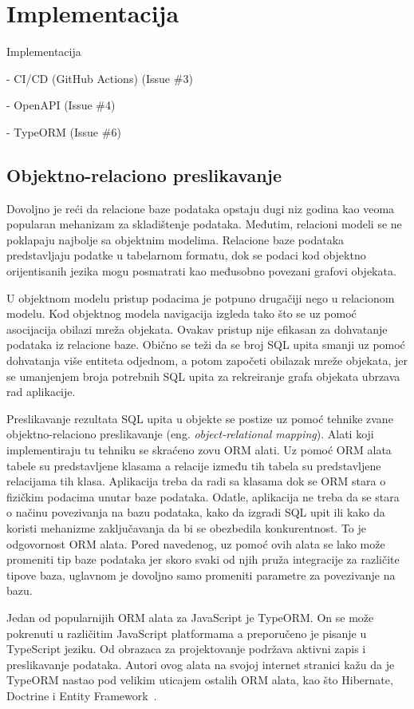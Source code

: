 \chapter{Implementacija}\label{ch:impl}

Implementacija

- CI/CD (GitHub Actions) (Issue \#3)

- OpenAPI (Issue \#4)

- TypeORM (Issue \#6)
\section{Objektno-relaciono preslikavanje}\label{sec:objektno-relaciono-preslikavanje}

Dovoljno je reći da relacione baze podataka opstaju dugi niz godina kao veoma popularan mehanizam za skladištenje
podataka. Međutim, relacioni modeli se ne poklapaju najbolje sa objektnim modelima. Relacione baze podataka
predstavljaju podatke u tabelarnom formatu, dok se podaci kod objektno orijentisanih jezika mogu posmatrati kao
međusobno povezani grafovi objekata.

U objektnom modelu pristup podacima je potpuno drugačiji nego u relacionom modelu. Kod objektnog modela navigacija
izgleda tako što se uz pomoć asocijacija obilazi mreža objekata. Ovakav pristup nije efikasan za dohvatanje podataka iz
relacione baze. Obično se teži da se broj SQL upita smanji uz pomoć dohvatanja više entiteta odjednom, a potom započeti
obilazak mreže objekata, jer se umanjenjem broja potrebnih SQL upita za rekreiranje grafa objekata ubrzava rad
aplikacije.

Preslikavanje rezultata SQL upita u objekte se postize uz pomoć tehnike zvane objektno-relaciono preslikavanje
(eng. \textit{object-relational mapping}). Alati koji implementiraju tu tehniku se skraćeno zovu ORM alati. Uz pomoć ORM alata
tabele su predstavljene klasama a relacije između tih tabela su predstavljene relacijama tih klasa. Aplikacija treba da
radi sa klasama dok se ORM stara o fizičkim podacima unutar baze podataka. Odatle, aplikacija ne treba da se stara o
načinu povezivanja na bazu podataka, kako da izgradi SQL upit ili kako da koristi mehanizme zaključavanja da bi se
obezbedila konkurentnost. To je odgovornost ORM alata. Pored navedenog, uz pomoć ovih alata se lako može promeniti tip
baze podataka jer skoro svaki od njih pruža integracije za različite tipove baza, uglavnom je dovoljno samo promeniti
parametre za povezivanje na bazu.

Jedan od popularnijih ORM alata za JavaScript je TypeORM. On se može pokrenuti u različitim JavaScript platformama a
preporučeno je pisanje u TypeScript jeziku. Od obrazaca za projektovanje podržava aktivni zapis i preslikavanje podataka.
Autori ovog alata na svojoj internet stranici kažu da je TypeORM nastao pod velikim uticajem ostalih ORM alata, kao što
Hibernate, Doctrine i Entity Framework~\cite{TypeORM}.

